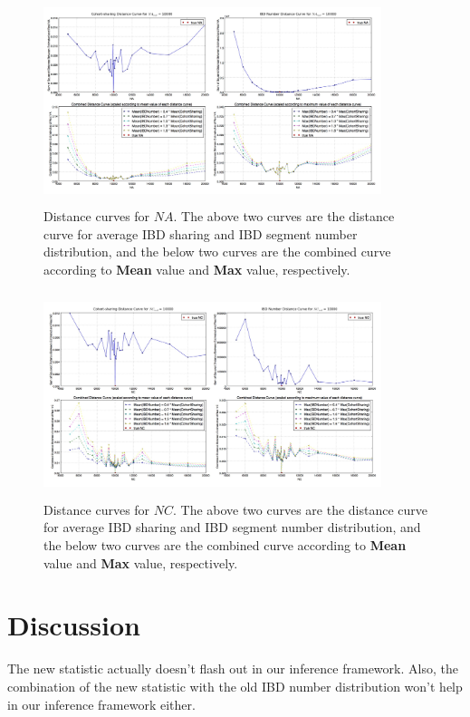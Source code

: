 \documentclass{bioinfo}
\begin{document}
\begin{figure}[h]
\centerline{\includegraphics[width=280pt, height=170pt]{like_com_NA.jpg}}
\caption{Distance curves for $NA$. The above two curves are the distance curve for average IBD sharing and IBD segment number distribution, and the below two curves are the combined curve according to \textbf{Mean} value and \textbf{Max} value, respectively.}\label{fig:dis_com_NA}
\end{figure}

\begin{figure}[h]
\centerline{\includegraphics[width=280pt, height=170pt]{like_com_NC.jpg}}
\caption{Distance curves for $NC$. The above two curves are the distance curve for average IBD sharing and IBD segment number distribution, and the below two curves are the combined curve according to \textbf{Mean} value and \textbf{Max} value, respectively.}\label{fig:dis_com_NC}
\end{figure}



\section{Discussion}

The new statistic actually doesn't flash out in our inference framework. Also, the combination of the new statistic with the old IBD number distribution won't help in our inference framework either.
\end{document}
